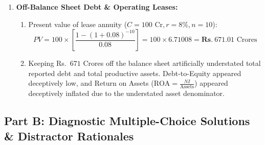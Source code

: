 \begin{enumerate}[label=\textbf{P2.\arabic*}]
    \item \textbf{Off-Balance Sheet Debt \& Operating Leases:}
    \begin{enumerate}[label=(\alph*)]
        \item Present value of lease annuity ($C = 100\text{ Cr}, r = 8\%, n = 10$):
        \begin{equation*}
        PV = 100 \times \left[\frac{1 - (1 + 0.08)^{-10}}{0.08}\right] = 100 \times 6.71008 = \mathbf{Rs.~} 671.01\text{ Crores}
        \end{equation*}
        \item Keeping Rs.~$671$ Crores off the balance sheet artificially understated total reported debt and total productive assets. Debt-to-Equity appeared deceptively low, and Return on Assets ($\text{ROA} = \frac{NI}{\text{Assets}}$) appeared deceptively inflated due to the understated asset denominator.
    \end{enumerate}
\end{enumerate}

\subsection*{Part B: Diagnostic Multiple-Choice Solutions \& Distractor Rationales}

